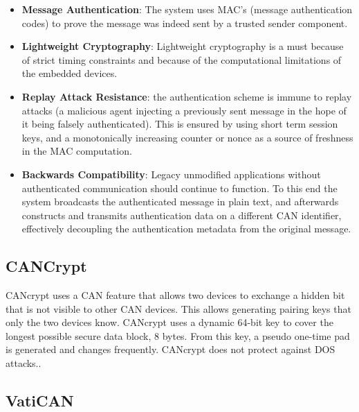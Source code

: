 \begin{itemize}
	\item \textbf{Message Authentication}: The system uses MAC's (message authentication codes) to prove the message was indeed sent by a trusted sender component.\cite{VulCAN}
	
	\item \textbf{Lightweight Cryptography}: Lightweight cryptography is a must because of strict timing constraints and because of the computational limitations of the embedded devices.\cite{VulCAN}
	
	\item \textbf{Replay Attack Resistance}: the authentication scheme is immune to replay attacks (a malicious agent injecting a previously sent message in the hope of it being falsely authenticated). This is ensured by using short term session keys, and a monotonically increasing counter or nonce as a source of freshness in the MAC computation.\cite{VulCAN}
	
	\item \textbf{Backwards Compatibility}: Legacy unmodified applications without authenticated communication should continue to function. To this end the system broadcasts the authenticated message in plain text, and afterwards constructs and transmits authentication data on a different CAN identifier, effectively decoupling the authentication metadata from the original message.\cite{VulCAN}
\end{itemize}

\subsection{CANCrypt}
\label{subsec:cancrypt}

CANcrypt uses a CAN feature that allows two devices to exchange a hidden bit that is not visible to other CAN devices. This allows generating pairing keys that only the two devices know. CANcrypt uses a dynamic 64-bit key to cover the longest possible secure data block, 8 bytes. From this key, a pseudo one-time pad is generated and changes frequently. CANcrypt does not protect against DOS attacks.\cite{Pfeiffer}.

\subsection{VatiCAN} 
\label{subsec:vatican}

